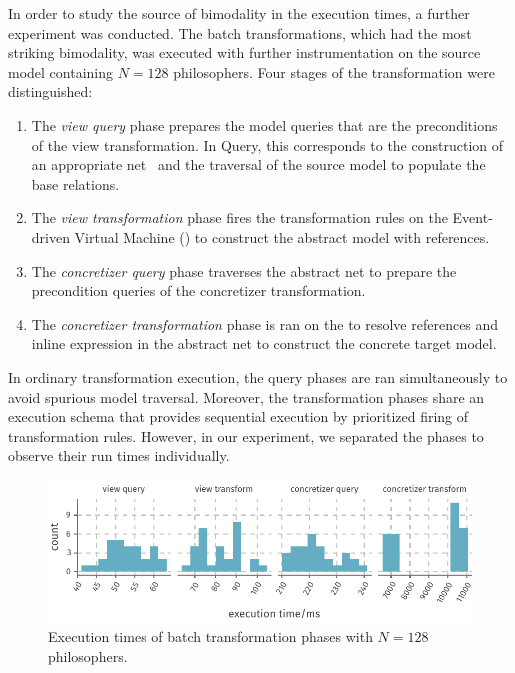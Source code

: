 In order to study the source of bimodality in the execution times, a further experiment was conducted. The batch transformations, which had the most striking bimodality, was executed with further instrumentation on the source model containing \(N = 128\) philosophers. Four stages of the transformation were distinguished:
\begin{enumerate}
\item The \emph{view query} phase prepares the model queries that are the preconditions of the view transformation. In  Query, this corresponds to the construction of an appropriate  net~ and the traversal of the source model to populate the base relations.
\item The \emph{view transformation} phase fires the transformation rules on the  Event-driven Virtual Machine () to construct the abstract  model with references.
\item The \emph{concretizer query} phase traverses the abstract net to prepare the precondition queries of the concretizer transformation.
\item The \emph{concretizer transformation} phase is ran on the  to resolve references and inline expression in the abstract net to construct the concrete  target model.
\end{enumerate}
In ordinary transformation execution, the query phases are ran simultaneously to avoid spurious model traversal. Moreover, the transformation phases share an  execution schema that provides sequential execution by prioritized firing of transformation rules. However, in our experiment, we separated the phases to observe their run times individually.

\begin{figure}
  \centering
  \includegraphics{figures/plot_histogram}
  \caption{Execution times of batch transformation phases with \(N = 128\) philosophers.}
  \label{fig:apply:histogram}
\end{figure}

